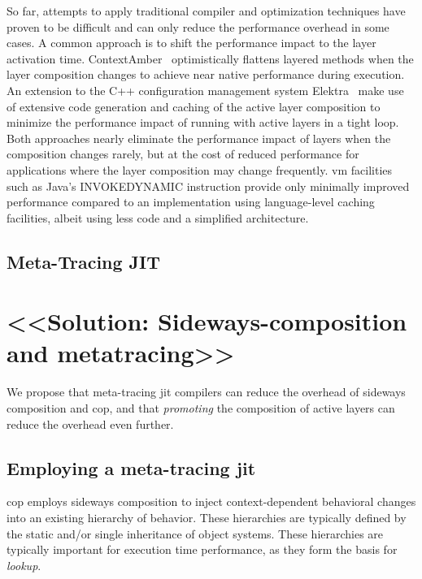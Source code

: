 \documentclass[preprint,english,10pt,nonatbib]{sigplanconf}
\begin{document}
So far, attempts to apply traditional compiler and optimization techniques have
proven to be difficult and can only reduce the performance overhead in some
cases. A common approach is to shift the performance impact to the layer
activation time. ContextAmber~\cite{springer2015efficient} optimistically
flattens layered methods when the layer composition changes to achieve near
native performance during execution. An extension to the C++ configuration
management system Elektra~\cite{Raab:2014:PEE:2637066.2637074} make use of
extensive code generation and caching of the active layer composition to
minimize the performance impact of running with active layers in a tight
loop. Both approaches nearly eliminate the performance impact of layers when the
composition changes rarely, but at the cost of reduced performance for
applications where the layer composition may change frequently. \ac{vm}
facilities such as Java's INVOKEDYNAMIC instruction provide only minimally
improved performance compared to an implementation using language-level caching
facilities, albeit using less code and a simplified architecture.

\subsection{Meta-Tracing JIT}
\label{sec:meta-tracing-jit}

\section{<<Solution: Sideways-composition and metatracing>>}

We propose that meta-tracing \ac{jit} compilers can reduce the overhead of
sideways composition and \ac{cop}, and that \emph{promoting} the composition of
active layers can reduce the overhead even further.

\subsection{Employing a meta-tracing \protect\acs{jit}}
\Acl{cop} employs sideways composition to inject context-dependent behavioral
changes into an existing hierarchy of behavior. These hierarchies are typically
defined by the static and/or single inheritance of object systems. These
hierarchies are typically important for execution time performance, as they
form the basis for \emph{lookup}.
\end{document}

